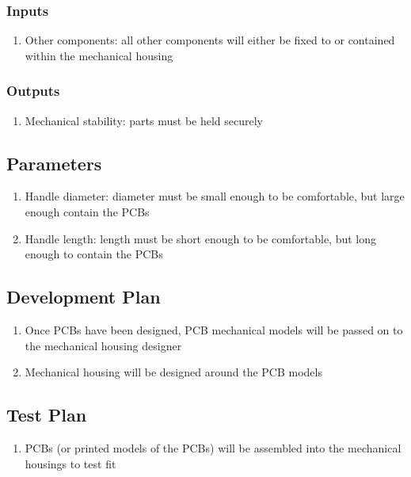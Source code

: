 \documentclass{notes}
\begin{document}
\subsubsection{Inputs}

\begin{enumerate}
    \item Other components: all other components will either be fixed to or contained within the mechanical housing
\end{enumerate}

\subsubsection{Outputs}

\begin{enumerate}
    \item Mechanical stability: parts must be held securely
\end{enumerate}

\subsection{Parameters}

\begin{enumerate}
    \item Handle diameter: diameter must be small enough to be comfortable, but large enough contain the PCBs
    \item Handle length: length must be short enough to be comfortable, but long enough to contain the PCBs
\end{enumerate}

\subsection{Development Plan}

\begin{enumerate}
    \item Once PCBs have been designed, PCB mechanical models will be passed on to the mechanical housing designer
    \item Mechanical housing will be designed around the PCB models
\end{enumerate}

\subsection{Test Plan}

\begin{enumerate}
    \item PCBs (or printed models of the PCBs) will be assembled into the mechanical housings to test fit
\end{enumerate}
\end{document}
